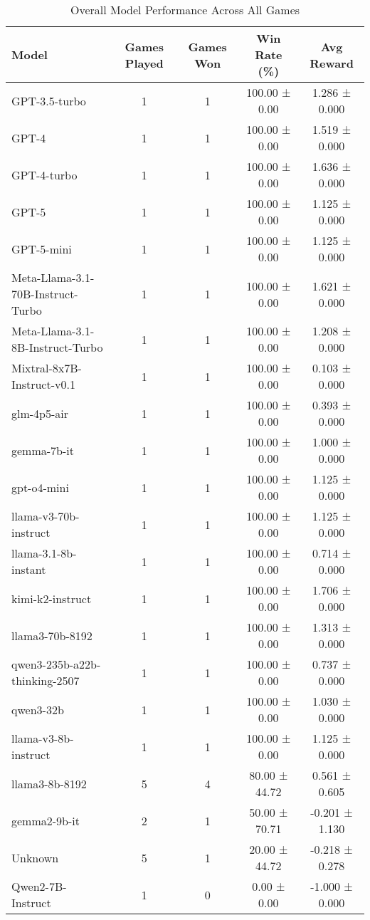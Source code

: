 \begin{table}[htbp]
\centering
\caption{Overall Model Performance Across All Games}
\begin{tabular}{lcccc}
\toprule
Model & Games Played & Games Won & Win Rate (\%) & Avg Reward \\
\midrule
GPT-3.5-turbo & 1 & 1 & 100.00 ± 0.00 & 1.286 ± 0.000 \\
GPT-4 & 1 & 1 & 100.00 ± 0.00 & 1.519 ± 0.000 \\
GPT-4-turbo & 1 & 1 & 100.00 ± 0.00 & 1.636 ± 0.000 \\
GPT-5 & 1 & 1 & 100.00 ± 0.00 & 1.125 ± 0.000 \\
GPT-5-mini & 1 & 1 & 100.00 ± 0.00 & 1.125 ± 0.000 \\
Meta-Llama-3.1-70B-Instruct-Turbo & 1 & 1 & 100.00 ± 0.00 & 1.621 ± 0.000 \\
Meta-Llama-3.1-8B-Instruct-Turbo & 1 & 1 & 100.00 ± 0.00 & 1.208 ± 0.000 \\
Mixtral-8x7B-Instruct-v0.1 & 1 & 1 & 100.00 ± 0.00 & 0.103 ± 0.000 \\
glm-4p5-air & 1 & 1 & 100.00 ± 0.00 & 0.393 ± 0.000 \\
gemma-7b-it & 1 & 1 & 100.00 ± 0.00 & 1.000 ± 0.000 \\
gpt-o4-mini & 1 & 1 & 100.00 ± 0.00 & 1.125 ± 0.000 \\
llama-v3-70b-instruct & 1 & 1 & 100.00 ± 0.00 & 1.125 ± 0.000 \\
llama-3.1-8b-instant & 1 & 1 & 100.00 ± 0.00 & 0.714 ± 0.000 \\
kimi-k2-instruct & 1 & 1 & 100.00 ± 0.00 & 1.706 ± 0.000 \\
llama3-70b-8192 & 1 & 1 & 100.00 ± 0.00 & 1.313 ± 0.000 \\
qwen3-235b-a22b-thinking-2507 & 1 & 1 & 100.00 ± 0.00 & 0.737 ± 0.000 \\
qwen3-32b & 1 & 1 & 100.00 ± 0.00 & 1.030 ± 0.000 \\
llama-v3-8b-instruct & 1 & 1 & 100.00 ± 0.00 & 1.125 ± 0.000 \\
llama3-8b-8192 & 5 & 4 & 80.00 ± 44.72 & 0.561 ± 0.605 \\
gemma2-9b-it & 2 & 1 & 50.00 ± 70.71 & -0.201 ± 1.130 \\
Unknown & 5 & 1 & 20.00 ± 44.72 & -0.218 ± 0.278 \\
Qwen2-7B-Instruct & 1 & 0 & 0.00 ± 0.00 & -1.000 ± 0.000 \\
\bottomrule
\end{tabular}
\end{table}
